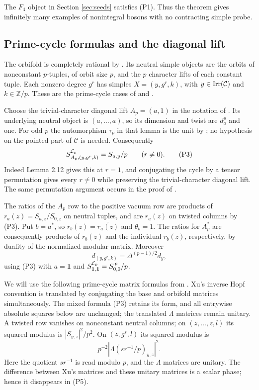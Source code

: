 \documentclass[10pt]{amsart}
\newcommand{\one}{\mathbf1}\newcommand{\C}{\mathcal C}
\begin{document}
The $F_4$ object in Section \ref{sec:seeds} satisfies (P1). Thus the theorem gives infinitely many examples of nonintegral bosons with no contracting simple probe.

\subsection{Prime-cycle formulas and the diagonal lift}
The orbifold is completely rational by
\cite[Theorem 2.7]{Xu}. Its neutral simple objects are the orbits
of nonconstant $p$-tuples, of orbit size $p$, and the $p$ character
lifts of each constant tuple. Each nonzero degree $g^r$ has
simples $X=(y,g^r,k)$, with $y\in\Irr(\C)$ and
$k\in\mathbb Z/p$. These are the prime-cycle cases of
\cite[Section 2.12]{Xu} and
\cite[Proposition 6.7]{DRX}.

Choose the trivial-character diagonal lift $A_p=(a,1)$
in the notation of \cite[Lemma 2.12]{Xu}. Its underlying
neutral object is $(a,\ldots,a)$, so its dimension and
twist are $d_a^p$ and one. For odd $p$ the automorphism
$\tau_p$ in that lemma is the unit by
\cite[Proposition 3.4(2)]{Xu}; no hypothesis on the pointed
part of $\C$ is needed. Consequently
\[
 S^{\mathcal E_p}_{A_p,(y,g^r,k)}=S_{a,y}/p\qquad(r\ne0).                 \tag{P3}
\]
Indeed Lemma 2.12 gives this at $r=1$, and conjugating the
cycle by a tensor permutation gives every $r\ne0$ while
preserving the trivial-character diagonal lift. The same
permutation argument occurs in the proof of
\cite[Proposition 3.8(2)]{Xu}.

The ratios of the $A_p$ row to the positive vacuum row
are products of $r_a(z)=S_{a,z}/S_{0,z}$ on neutral
tuples, and are $r_a(z)$ on twisted columns by (P3).
Put $b=a^*$, so $r_b(z)=\overline{r_a(z)}$ and
$\theta_b=1$. The ratios for $A_p^*$ are consequently
products of $r_b(z)$ and the individual $r_b(z)$,
respectively, by duality of the normalized modular matrix.
Moreover
\[
 d_{(y,g^r,k)}=\Delta^{(p-1)/2}d_y,                              \tag{P4}
\]
using (P3) with $a=\one$ and
$S^{\E_p}_{\one,\one}=S_{0,0}^{\,p}/p$.

We will use the following prime-cycle matrix formulas from
\cite[Proposition 3.8 and Theorem 3.12]{Xu}.
Xu's inverse Hopf convention is translated by conjugating
the base and orbifold matrices simultaneously. The mixed
formula (P3) retains its form, and all entrywise absolute
squares below are unchanged; the translated $\Lambda$
matrices remain unitary.
A twisted row vanishes on nonconstant neutral columns; on
$(z,\ldots,z,l)$ its squared modulus is $|S_{y,z}|^2/p^2$.
On $(z,g^s,l)$ its squared modulus is
\[
          p^{-2}|\Lambda(sr^{-1}/p)_{y,z}|^2.                    \tag{P5}
\]
Here the quotient $sr^{-1}$ is read modulo $p$, and the
$\Lambda$ matrices are unitary. The difference between
Xu's matrices and these unitary matrices is a scalar
phase; hence it disappears in (P5).
\end{document}
